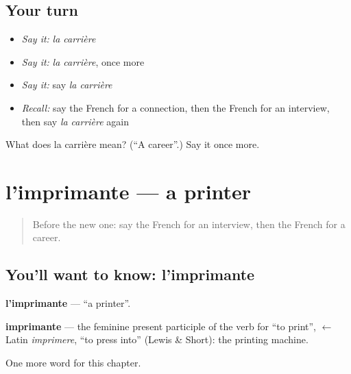 \subsection*{Your turn}
\begin{itemize}
\raggedright
  \item \emph{Say it:} \emph{la carrière}
  \item \emph{Say it:} \emph{la carrière}, once more
  \item \emph{Say it:} say \emph{la carrière}
  \item \emph{Recall:} say the French for a connection, then the French for an interview, then say \emph{la carrière} again
\end{itemize}

\begin{tcolorbox}[breakable,colback=teal!4,colframe=teal!35!black,title={Before you move on}]
What does la carrière mean? (\textquotedblleft{}A career\textquotedblright{}.) Say it once more.
\end{tcolorbox}
\section[l'imprimante]{l'imprimante — a printer}

\label{lesson:FR-C204-imprimante}



\begin{quote}
Before the new one: say the French for an interview, then the French for a career.
\end{quote}

\subsection*{You'll want to know: l'imprimante}
\textbf{l'imprimante} — \textquotedblleft{}a printer\textquotedblright{}.

\begin{cousinweb}
\textbf{imprimante} — the feminine present participle of the verb for \textquotedblleft{}to print\textquotedblright{}, $\leftarrow$ Latin \emph{imprimere}, \textquotedblleft{}to press into\textquotedblright{} (Lewis \& Short): the printing machine.
\end{cousinweb}

\begin{grammarlens}[title={What you've built}]
One more word for this chapter.
\end{grammarlens}

